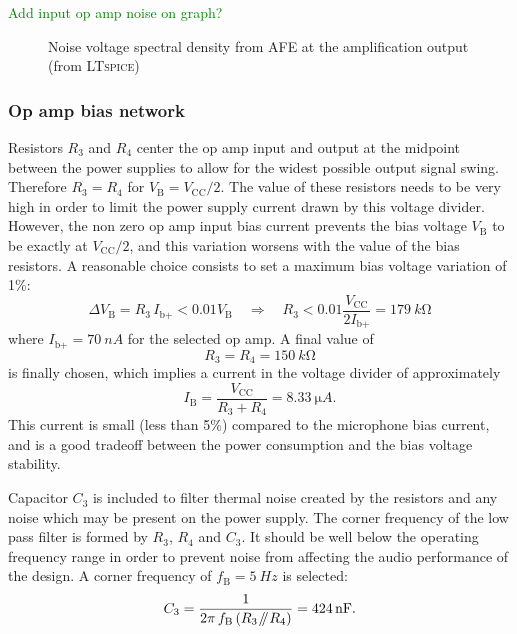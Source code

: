 \documentclass{EPL-master-thesis-covers-EN}
\newcommand{\parallelsum}{\mathbin{\!/\mkern-5mu/\!}}
\newcommand{\te}[1]{\textrm{#1}}
\begin{document}

\textcolor{green}{Add input op amp noise on graph?}

\begin{figure}[H]
    \centering
    
    \caption{Noise voltage spectral density from AFE at the amplification output (from \textsc{LTspice})}
    \label{fig:output_noise_op_amp_freq}
\end{figure}

\subsubsection*{Op amp bias network}

Resistors $R_3$ and $R_4$ center the op amp input and output at the midpoint between the power supplies to allow for the widest possible output signal swing. Therefore $R_3 = R_4$ for $V_\te{B} = V_\te{CC} / 2$. The value of these resistors needs to be very high in order to limit the power supply current drawn by this voltage divider. However, the non zero op amp input bias current prevents the bias voltage $V_\te{B}$ to be exactly at $V_\te{CC} / 2$, and this variation worsens with the value of the bias resistors. A reasonable choice consists to set a maximum bias voltage variation of 1\%:
\[
 \Delta V_\te{B} = R_3 \, I_\te{b+} < 0.01 V_\te{B} \quad \Rightarrow \quad R_3 < 0.01 \frac{V_\te{CC}}{2I_\te{b+}} = \SI{179}{k\ohm}
\]
where $I_\te{b+} = \SI{70}{nA}$ for the selected op amp. A final value of
\[
 R_3 = R_4 = \SI{150}{k\ohm}
\]
is finally chosen, which implies a current in the voltage divider of approximately
\[
 I_\te{B} = \frac{V_\te{CC}}{R_3 + R_4} = \SI{8.33}{\micro A}.
\]
This current is small (less than 5\%) compared to the microphone bias current, and is a good tradeoff between the power consumption and the bias voltage stability.

Capacitor $C_3$ is included to filter thermal noise created by the resistors and any noise which may be present on the power supply. The corner frequency of the low pass filter is formed by $R_3$, $R_4$ and $C_3$. It should be well below the operating frequency range in order to prevent noise from affecting the audio performance of the design. A corner frequency of $f_\te{B} = \SI{5}{Hz}$ is selected:
\[
 C_3 = \frac{1}{2 \pi \, f_\te{B} \, (R_3 \parallelsum R_4)} = \SI{424}{nF}.
\]
\end{document}
